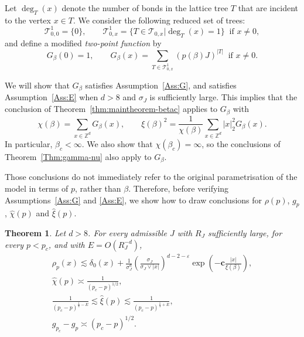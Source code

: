 \documentclass[11pt,a4paper]{article}
\numberwithin{equation}{section}
\theoremstyle{plain}
\newtheorem{Thm}{Theorem}[section]
\theoremstyle{definition}
\newcommand\1{\mathds{1}}
\newcommand\bfc{\mathbf{c}}
\begin{document}
Let $\deg_T(x)$ denote the number of bonds in the lattice tree $T$ that
are incident to the vertex $x\in T$.
We consider the following reduced set of trees:
\begin{equation}
    \mathcal T^1_{0,0} = \{0\}, \qquad
    \mathcal{T}^1_{0,x} = \{T \in \mathcal{T}_{0,x} | \deg_{T}(x) = 1 \}
    \;\; \text{if $x \neq 0$},
\end{equation}
and define a modified \emph{two-point function} by
\begin{equation}
    G_{\beta}(0) = 1, \qquad
    G_\beta(x) =
    \sum_{T \in \mathcal{T}^1_{0,x}} (p(\beta)J) ^{|T|} \;\;\text{if $x \neq 0$}.
\end{equation}

We will show that $G_\beta$ satisfies Assumption~\ref{Ass:G},  and
satisfies Assumption~\ref{Ass:E}
when $d>8$ and $\sigma_J$ is
sufficiently large.  This implies that the conclusion of
Theorem~\ref{thm:maintheorem-betac} applies
to $G_\beta$ with
\begin{equation}
    \chi(\beta) = \sum_{x\in \mathbb Z^d} G_\beta(x),
    \qquad
    \xi(\beta)^2 = \frac{1}{\chi(\beta)}\sum_{x\in \mathbb Z^d}|x|_2^2 G_\beta(x).
\end{equation}
In particular, $\beta_c<\infty$.
We also show that $\chi(\beta_c)=\infty$, so
the conclusions of Theorem~\ref{Thm:gamma-nu} also apply to $G_\beta$.



Those conclusions do not immediately refer to the original parametrisation
of the model in terms of $p$, rather than $\beta$.
Therefore, before verifying
Assumptions~\ref{Ass:G} and \ref{Ass:E}, we show how to draw conclusions for
$\rho(p)$, $g_p$, $\hat\chi(p)$ and $\hat\xi(p)$.

\begin{Thm}
\label{Thm:LTp}
Let $d>8$. For every admissible $J$ with $R_J$ sufficiently large, for every $p <p_c$, and with $E=O(R_J^{-d})$,
\begin{gather}
\label{eq:LTrhobd}
        \rho_p(x)  \lesssim
     \delta_0(x)
    + \frac{1}{\sigma_J^d}
    \left(\frac{\sigma_J}{\sigma_J \vee|x|} \right)^{d-2-\varepsilon}
    \exp\left(-\bfc\frac{|x|}{\xi(\beta)}\right),
    \\
\label{eq:LTchibd}
    \hat\chi(p) \asymp \frac{1}{(p_c-p)^{1/2}},
    \\
\label{eq:LTxibd}
     \frac{1}{(p_c-p)^{\frac 14 -E}}
     \lesssim \hat\xi(p)
     \lesssim \frac{1}{(p_c-p)^{\frac 14 +E}},
     \\
\label{eq:LTgbd}
     g_{p_c}-g_p \asymp  (p_c-p)^{1/2} .
\end{gather}
\end{Thm}
\end{document}
